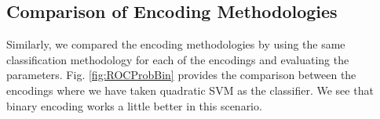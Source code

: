 \documentclass{article} %
\begin{document}
	\subsection{Comparison of Encoding Methodologies}
	
	Similarly, we compared the encoding methodologies by using the same classification methodology for each of the encodings and evaluating the parameters. Fig. \ref{fig:ROCProbBin} provides the comparison between the encodings where we have taken quadratic SVM as the classifier. We see that binary encoding works a little better in this scenario.
	
	\begin{figure}[h]
		\begin{center}

\end{center}
\end{figure}
\end{document}

